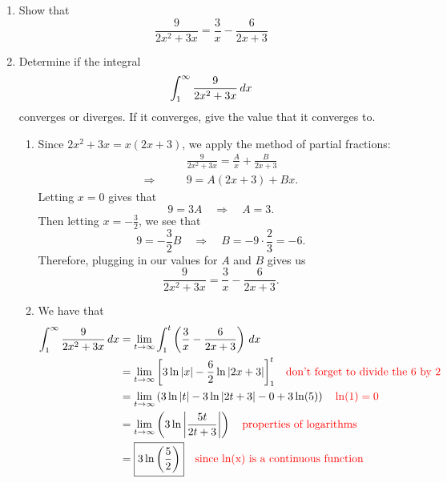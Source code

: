\documentclass[noinstructornotes]{ximera}
\begin{document}
\begin{problem}
	\begin{enumerate}
	\item  Show that 
		\begin{equation*}
		\frac{9}{2x^2+3x} = \frac{3}{x} - \frac{6}{2x+3}
		\end{equation*}
	
	\item  Determine if the integral
		\begin{equation*}
		\int_1^\infty \frac{9}{2x^2+3x} \,d x
		\end{equation*}
	converges or diverges.  If it converges, give the value that it converges to.
	
	
	
	\begin{freeResponse}
	\begin{enumerate}
	\item
	Since $2x^2+3x = x(2x+3)$, we apply the method of partial fractions:
		\begin{align*}
		&\frac{9}{2x^2+3x} = \frac{A}{x} + \frac{B}{2x+3}  \\
		\Longrightarrow \qquad &9 = A(2x+3) + Bx.
		\end{align*}
	Letting $x=0$ gives that
		\begin{equation*}
		9 = 3A	\quad	\Longrightarrow \quad	A = 3.
		\end{equation*}
	Then letting $x = -\frac{3}{2}$, we see that
		\begin{equation*}
		9 = - \frac{3}{2} B \quad \Longrightarrow \quad B = - 9 \cdot \frac{2}{3} = -6.
		\end{equation*}
	Therefore, plugging in our values for $A$ and $B$ gives us
		\begin{equation*}
		\frac{9}{2x^2+3x} = \frac{3}{x} - \frac{6}{2x+3}.
		\end{equation*}
		
		
		
	\item We have that
		\begin{align*}
		\int_1^\infty \frac{9}{2x^2+3x} \,d x &= \lim_{t \to \infty} \int_1^t \left( \frac{3}{x} - \frac{6}{2x+3} \right) \,d x  \\
		&= \lim_{t \to \infty} \bigg[ 3\ln|x| - \frac{6}{2} \ln|2x+3| \bigg]_1^t  \quad {\color{red}\text{don't forget to divide the 6 by 2}}  \\
		&= \lim_{t \to \infty} \left( 3\ln|t| - 3\ln|2t+3| - 0 + 3\ln(5) \right)  \quad {\color{red}\ln(1) = 0} \\
		&= \lim_{t \to \infty} \left( 3 \ln \left| \frac{5t}{2t+3} \right| \right)  \quad {\color{red}\text{properties of logarithms}}  \\
		&= \boxed{3 \ln \left( \frac{5}{2} \right)}	\quad	{\color{red}\text{since ln(x) is a continuous function}}
		\end{align*}
	
	\end{enumerate}
	\end{freeResponse}
	
	\end{enumerate}
	
		
\end{problem}
\end{document}
